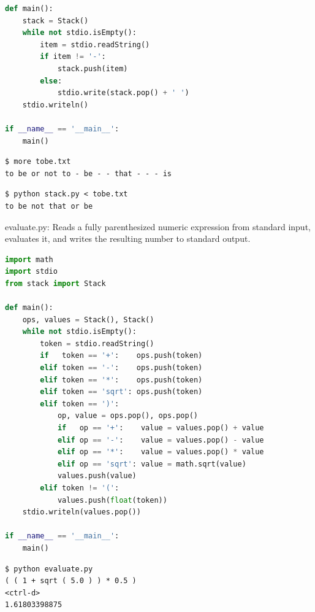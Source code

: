 \documentclass[8pt,a4paper,compress,handout]{beamer}
\begin{document}
\begin{frame}[fragile]
\begin{lstlisting}[language=Python]
def main():
    stack = Stack()
    while not stdio.isEmpty():
        item = stdio.readString()
        if item != '-':
            stack.push(item)
        else:
            stdio.write(stack.pop() + ' ')
    stdio.writeln()

if __name__ == '__main__':
    main()
\end{lstlisting}

\begin{lstlisting}[language={}]
$ more tobe.txt
to be or not to - be - - that - - - is
\end{lstlisting}

\begin{lstlisting}[language={}]
$ python stack.py < tobe.txt 
to be not that or be
\end{lstlisting}
\end{frame}

\begin{frame}[fragile]
\begin{framed}
\tiny evaluate.py: Reads a fully parenthesized numeric expression from standard input, evaluates it, and writes the resulting number to standard output.
\end{framed}

\begin{lstlisting}[language=Python]
import math
import stdio
from stack import Stack

def main():
    ops, values = Stack(), Stack()
    while not stdio.isEmpty():
        token = stdio.readString()
        if   token == '+':    ops.push(token)
        elif token == '-':    ops.push(token)
        elif token == '*':    ops.push(token)
        elif token == 'sqrt': ops.push(token)
        elif token == ')':
            op, value = ops.pop(), ops.pop()
            if   op == '+':    value = values.pop() + value
            elif op == '-':    value = values.pop() - value
            elif op == '*':    value = values.pop() * value
            elif op == 'sqrt': value = math.sqrt(value)
            values.push(value)
        elif token != '(':
            values.push(float(token))
    stdio.writeln(values.pop())

if __name__ == '__main__':
    main()
\end{lstlisting}

\begin{lstlisting}[language={}]
$ python evaluate.py
( ( 1 + sqrt ( 5.0 ) ) * 0.5 )
<ctrl-d>
1.61803398875
\end{lstlisting}
\end{frame}
\end{document}
